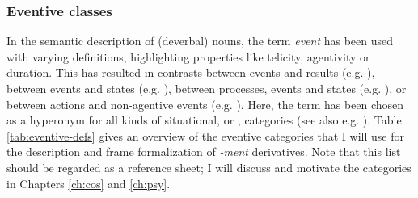 \subsubsection{Eventive classes} 
\label{sec:meth-Nsem-semcat-event}

In the semantic description of (deverbal) nouns, the term \textit{event} has been used with varying definitions, highlighting properties like telicity, agentivity or duration. This has resulted in contrasts between events and results (e.g. \citealt{Grimshaw.1990}), between events and states (e.g. \citealt{Filip.1999,Barque.2011}), between processes, events and states (e.g. \citealt{Ehrich.2000}), or between actions and non-agentive events (e.g. \citealt{Sil.2010}). Here, the term  has been chosen as a hyperonym for all kinds of situational, or , categories (see also e.g. \citealt[84]{VanValinJr.1997}). 
Table \ref{tab:eventive-defs} gives an overview of the eventive categories that I will use for the description and frame formalization of \textit{-ment} derivatives. Note that this list should be regarded as a reference sheet; I will discuss and motivate the categories in Chapters \ref{ch:cos} and \ref{ch:psy}. 

